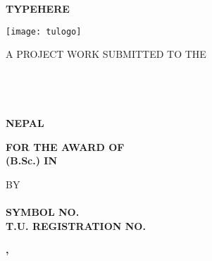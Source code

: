 \thispagestyle{empty} %
\begin{center}

	{\fontsize{16pt}{18pt}\selectfont

	\textbf{
		TYPEHERE
	}
	}

	\vspace{1cm}

	\texttt{[image: tulogo]}

	\vspace{1cm}

	{\fontsize{14pt}{18pt}\selectfont
	A PROJECT WORK SUBMITTED TO THE\\
	\textbf{\MakeUppercase{\depart\\
	\clz\\
	\iost\\
	\tu\\
	NEPAL}}

	\vspace{1cm}

	\textbf{FOR THE AWARD OF\\ 
	\MakeUppercase{\bsc}{} (B.Sc.) IN \MakeUppercase{\sub}}

	\vspace{1cm}

	BY\\
	\textbf{\MakeUppercase{\myname\\
	SYMBOL NO.\, \sym\\
	T.U. REGISTRATION NO.\, \reg}}
		
	\vspace{1cm}

	\textbf{\uppermonth, \the\year}}

\end{center}

\pagebreak











